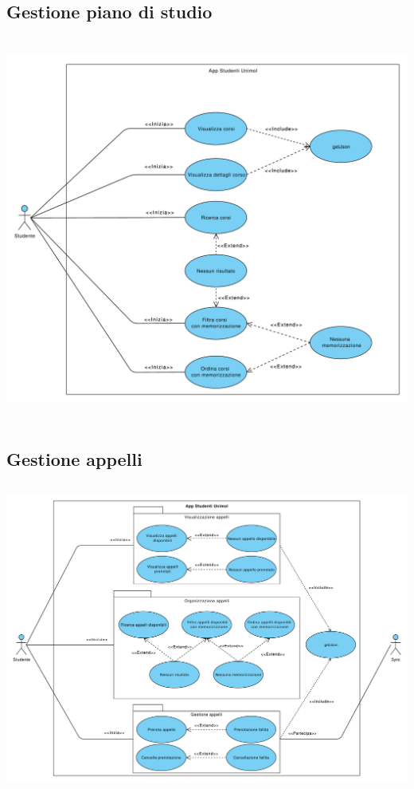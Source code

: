 \subsection{Gestione piano di studio}
\begin{center}
	\includegraphics[height=5in]{imgs/gruppo1/UCD-gestione_piano_di_studio.pdf}
\end{center}
\newpage

\subsection{Gestione appelli}
\begin{center}
	\includegraphics[height=4in]{imgs/gruppo1/UCD-gestione_appelli.pdf}
\end{center}
\newpage

